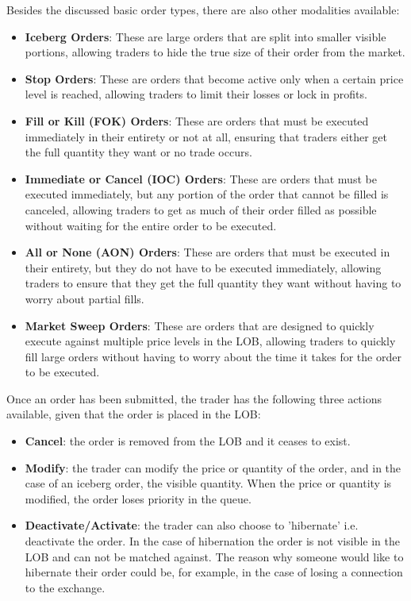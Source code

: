 \documentclass[12pt,a4paper]{cau_thesis}
\begin{document}
Besides the discussed basic order types, there are also other
modalities available:
\begin{itemize}
    \item \textbf{Iceberg Orders}: These are large orders that are split into smaller visible portions, allowing traders to hide the true size of their order from the market.
    \item \textbf{Stop Orders}: These are orders that become active only when a certain price level is reached, allowing traders to limit their losses or lock in profits.
    \item \textbf{Fill or Kill (FOK) Orders}: These are orders that must be executed immediately in their entirety or not at all, ensuring that traders either get the full quantity they want or no trade occurs.
    \item \textbf{Immediate or Cancel (IOC) Orders}: These are orders that must be executed immediately, but any portion of the order that cannot be filled is canceled, allowing traders to get as much of their order filled as possible without waiting for the entire order to be executed.
    \item \textbf{All or None (AON) Orders}: These are orders that must be executed in their entirety, but they do not have to be executed immediately, allowing traders to ensure that they get the full quantity they want without having to worry about partial fills.
    \item \textbf{Market Sweep Orders}: These are orders that are designed to quickly execute against multiple price levels in the LOB, allowing traders to quickly fill large orders without having to worry about the time it takes for the order to be executed.
\end{itemize}

Once an order has been submitted, the trader has the following three
actions available, given that the order is placed in the LOB:
\begin{itemize}
    \item \textbf{Cancel}: the order is removed from the LOB and it ceases to exist.
    \item \textbf{Modify}: the trader can modify the price or quantity of the order, and in the case of an iceberg order, the visible quantity. When the price or quantity is modified, the order loses priority in the queue.
    \item \textbf{Deactivate/Activate}: the trader can also choose to ’hibernate’ i.e. deactivate the order. In the case of hibernation the order is not visible in the LOB and can not be matched against. The reason why someone would like to hibernate their order could be, for example, in the case of losing a connection to the exchange.
\end{itemize}
\end{document}
